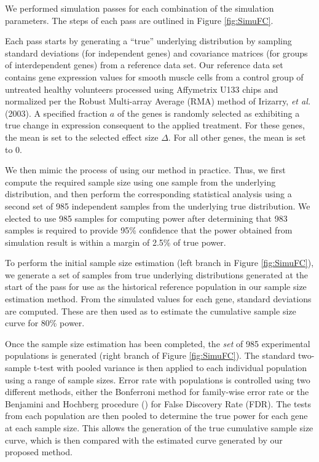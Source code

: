 \documentclass{bioinfo}
\begin{document}
We performed simulation passes for each combination of the
simulation parameters.  The steps of each pass are outlined in
Figure \ref{fig:SimuFC}.

Each pass starts by generating a ``true'' underlying distribution
by sampling standard deviations (for independent genes) and
covariance matrices (for groups of interdependent genes) from a
reference data set.  Our reference data set contains gene
expression values for smooth muscle cells from a control group of
untreated healthy volunteers processed using Affymetrix U133 chips
and normalized per the Robust Multi-array Average (RMA) method of
Irizarry, \textit{et al.} (2003).  A specified fraction $a$ of the
genes is randomly selected as exhibiting a true change in
expression consequent to the applied treatment. For these genes,
the mean is set to the selected effect size $\Delta$.  For all
other genes, the mean is set to $0$.

We then mimic the process of using our method in practice. Thus,
we first compute the required sample size using one sample from
the underlying distribution, and then perform the corresponding
statistical analysis using a second set of 985 independent samples
from the underlying true distribution.  We elected to use 985
samples for computing power after determining that 983 samples is
required to provide 95\% confidence that the power obtained from
simulation result is within a margin of 2.5\% of true power.

To perform the initial sample size estimation (left branch in Figure
\ref{fig:SimuFC}), we generate a set of samples from true underlying
distributions generated at the start of the pass for use as the
historical reference population in our sample size estimation
method.  From the simulated values for each gene, standard
deviations are computed. These are then used as to estimate the
cumulative sample size curve for 80\% power.

Once the sample size estimation has been completed, the \emph{set}
of 985 experimental populations is generated (right branch of
Figure \ref{fig:SimuFC}).  The standard two-sample t-test with
pooled variance is then applied to each individual population
using a range of sample sizes. Error rate with populations is
controlled using two different methods, either the Bonferroni
method for family-wise error rate or the Benjamini and Hochberg
procedure (\citealp{Benjamini95}) for False Discovery Rate (FDR).
The tests from each population are then pooled to determine the
true power for each gene at each sample size. This allows the
generation of the true cumulative sample size curve, which is then
compared with the estimated curve generated by our proposed
method.
\end{document}

